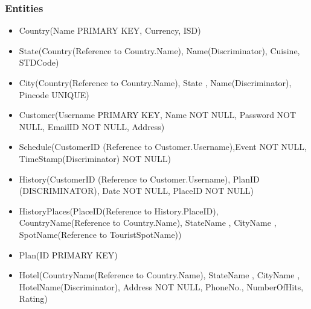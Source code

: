 \documentclass[a4paper,11pt]{article}
\begin{document}
\subsubsection{Entities}

\begin{itemize}
\item Country(Name PRIMARY KEY, Currency, ISD)
\item State(Country(Reference to Country.Name), Name(Discriminator), Cuisine, STDCode)
\item City(Country(Reference to Country.Name), State , Name(Discriminator), Pincode UNIQUE)
\item Customer(Username PRIMARY KEY, Name NOT NULL, Password NOT NULL, EmailID NOT NULL, Address)
\item Schedule(CustomerID (Reference to Customer.Username),Event NOT NULL, TimeStamp(Discriminator) NOT NULL)
\item History(CustomerID (Reference to Customer.Username), PlanID (DISCRIMINATOR), Date NOT NULL, PlaceID NOT NULL)
\item HistoryPlaces(PlaceID(Reference to History.PlaceID), CountryName(Reference to Country.Name), StateName , CityName , SpotName(Reference to TouristSpotName))
\item Plan(ID PRIMARY KEY)
\item Hotel(CountryName(Reference to Country.Name), StateName , CityName , HotelName(Discriminator), Address NOT NULL, PhoneNo., NumberOfHits, Rating)
\end{itemize}
\end{document}
